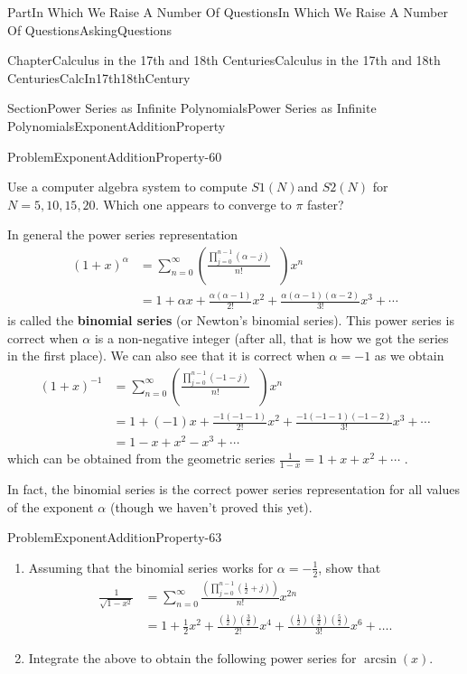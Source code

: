 \documentclass[oneside,10pt,]{book}
\newcommand{\terminology}[1]{\textbf{#1}}
\numberwithin{equation}{part}
\newcommand{\amp}{&}
\begin{document}
\begin{partptx}{Part}{In Which We Raise A Number Of Questions}{}{In Which We Raise A Number Of Questions}{}{}{AskingQuestions}
\begin{chapterptx}{Chapter}{Calculus in the 17th and 18th Centuries}{}{Calculus in the 17th and 18th Centuries}{}{}{CalcIn17th18thCentury}
\begin{sectionptx}{Section}{Power Series as Infinite Polynomials}{}{Power Series as Infinite Polynomials}{}{}{ExponentAdditionProperty}
\begin{problem}{Problem}{}{ExponentAdditionProperty-60}
\begin{enumerate}[label={(\alph*)}]
Use a computer algebra system to compute \(S1(N)\)and \(S2(N)\) for \(N=5,10,15,20\).  Which one appears to converge to \(\pi\) faster?%
\end{enumerate}
%
\end{problem}
In general the power series representation%
\begin{align*}
\left(1+x\right)^\alpha \amp  =\sum_{n=0}^\infty\left(\frac{\prod_{j=0}^{n-1}\left(\alpha-j\right)}{n!}\text{ } \right)x^n\\
\amp =1+\alpha x+\frac{\alpha\left(\alpha-1\right)}{2!}x^2+\frac{\alpha\left(\alpha-1\right)\left(\alpha-2\right)}{3!}x^3+\cdots
\end{align*}
is called the \terminology{binomial series} (or Newton's binomial series).  This power series is correct when \(\alpha\) is a non-negative integer (after all, that is how we got the series in the first place).  We can also see that it is correct when \(\alpha=-1\) as we obtain%
\begin{align*}
\left(1+x\right)^{-1}\amp =\sum_{n=0}^\infty\left(\frac{\prod_{j=0}^{n-1}\left(-1-j\right)}{n!}\text{ } \right)x^n\\
\amp =1+(-1)x+\frac{-1\left(-1-1\right)}{2!}x^2+\frac{-1\left(-1-1\right)\left(-1-2\right)}{3!}x^3+\cdots\\
\amp =1-x+x^2-x^3+\cdots
\end{align*}
which can be obtained from the geometric series \(\frac{1}{1-x}=1+x+x^2+\cdots\) .%
\par
In fact, the binomial series is the correct power series representation for all values of the exponent \(\alpha\) (though we haven't proved this yet).%
\begin{problem}{Problem}{}{ExponentAdditionProperty-63}%
\begin{enumerate}[font=\bfseries,label=(\alph*),ref=\alph*]%
\item{}Assuming that the binomial series works for \(\alpha =-\frac{1}{2}\), show that%
\begin{align*}
\frac{1}{\sqrt{1-x^2}}\amp{}=\sum^{\infty}_{n=0}{\frac{\left(\prod^{n-1}_{j=0}{\left(\frac{1}{2}+j\right)}\right)}{n!}x^{2n}}\\
\amp{}
=1+\frac{1}{2}x^2+\frac{\left(\frac{1}{2}\right)\left(\frac{3}{2}\right)}{2!}x^4+\frac{\left(\frac{1}{2}\right)\left(\frac{3}{2}\right)\left(\frac{5}{2}\right)}{3!}x^6+\dots.
\end{align*}
%
\item{}Integrate the above to obtain the following power series for \(\arcsin (x)\).%

\end{enumerate}
\end{problem}
\end{sectionptx}
\end{chapterptx}
\end{partptx}
\end{document}
